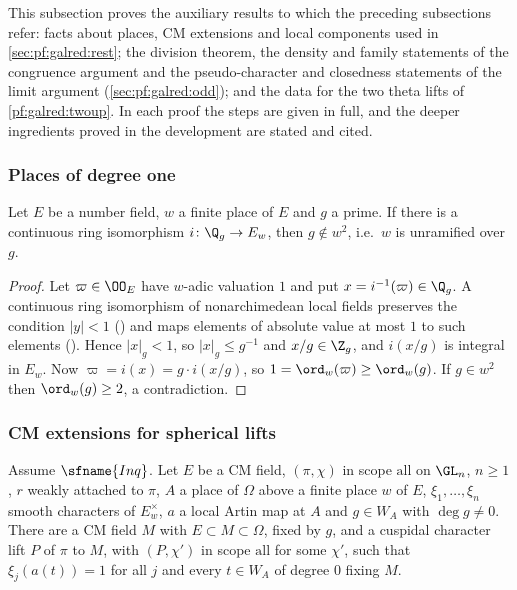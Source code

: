 This subsection proves the auxiliary results to which the preceding subsections refer: facts about places, CM
extensions and local components used in \cref{sec:pf:galred:rest}; the division theorem, the density and family
statements of the congruence argument and the pseudo-character and closedness statements of the limit argument
(\cref{sec:pf:galred:odd}); and the data for the two theta lifts of \cref{pf:galred:twoup}. In each proof the steps are
given in full, and the deeper ingredients proved in the development are stated and cited.

\subsubsection{Places of degree one}

\begin{lemma}\label{pf:galred:gnotsq}
Let $E$ be a number field, $w$ a finite place of $E$ and $g$ a prime. If there is a continuous ring isomorphism
$i\colon\Q_g\to E_w$, then $g\notin w^2$, i.e.\ $w$ is unramified over $g$.
\end{lemma}

\begin{proof}
Let $\varpi\in\OO_E$ have $w$-adic valuation $1$ and put $x=i^{-1}(\varpi)\in\Q_g$. A continuous ring isomorphism of
nonarchimedean local fields preserves the condition $|y|<1$ () and maps
elements of absolute value at most $1$ to such elements (). Hence
$|x|_g<1$, so $|x|_g\le g^{-1}$ and $x/g\in\Z_g$, and $i(x/g)$ is integral in $E_w$. Now $\varpi=i(x)=g\cdot i(x/g)$, so
$1=\ord_w(\varpi)\ge\ord_w(g)$. If $g\in w^2$ then $\ord_w(g)\ge2$, a contradiction.
\end{proof}

\subsubsection{CM extensions for spherical lifts}

\begin{lemma}\label{pf:galred:cmlift}
Assume $\sfname{Inq}$. Let $E$ be a CM field, $(\pi,\chi)$ in scope $\mathrm{all}$ on $\GL_n$, $n\ge1$, $r$ weakly
attached to $\pi$, $A$ a place of $\Omega$ above a finite place $w$ of $E$, $\xi_1,\dots,\xi_n$ smooth characters of
$E_w^\times$, $a$ a local Artin map at $A$ and $g\in W_A$ with $\deg g\ne0$. There are a CM field $M$ with $E\subset
M\subset\Omega$, fixed by $g$, and a cuspidal character lift $P$ of $\pi$ to $M$, with $(P,\chi')$ in scope
$\mathrm{all}$ for some $\chi'$, such that $\xi_j(a(t))=1$ for all $j$ and every $t\in W_A$ of degree $0$ fixing $M$.
\end{lemma}

